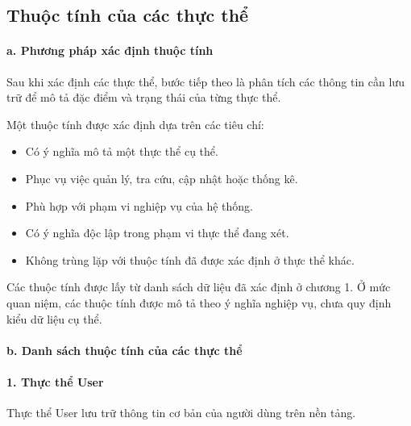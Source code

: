 \subsection{Thuộc tính của các thực thể}

\paragraph{a. Phương pháp xác định thuộc tính}

Sau khi xác định các thực thể, bước tiếp theo là phân tích các thông tin cần lưu trữ để mô tả đặc điểm và trạng thái của từng thực thể.

Một thuộc tính được xác định dựa trên các tiêu chí:

\begin{itemize}
\item Có ý nghĩa mô tả một thực thể cụ thể.
\item Phục vụ việc quản lý, tra cứu, cập nhật hoặc thống kê.
\item Phù hợp với phạm vi nghiệp vụ của hệ thống.
\item Có ý nghĩa độc lập trong phạm vi thực thể đang xét.
\item Không trùng lặp với thuộc tính đã được xác định ở thực thể khác.

\end{itemize}
Các thuộc tính được lấy từ danh sách dữ liệu đã xác định ở chương 1. Ở mức quan niệm, các thuộc tính được mô tả theo ý nghĩa nghiệp vụ, chưa quy định kiểu dữ liệu cụ thể.

\paragraph{b. Danh sách thuộc tính của các thực thể}

\paragraph{1. Thực thể User}\mbox{}\par

Thực thể User lưu trữ thông tin cơ bản của người dùng trên nền tảng.

